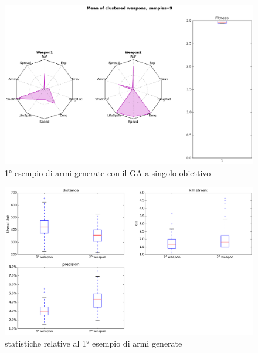 \documentclass[12pt, italian]{toptesi}
\begin{document}
\begin{figure}[tp]
\centering
\includegraphics[width=1.0\textwidth]{rad_single_obj_1}
\caption{1° esempio di armi generate con il GA a singolo obiettivo}
\label{fig:radar1}
\end{figure}

\begin{figure}[tp]
\centering
\includegraphics[width=1.0\textwidth]{stat_radar_1}
\caption{statistiche relative al 1° esempio di armi generate}
\label{fig:stat_radar_1}
\end{figure}
\end{document}
